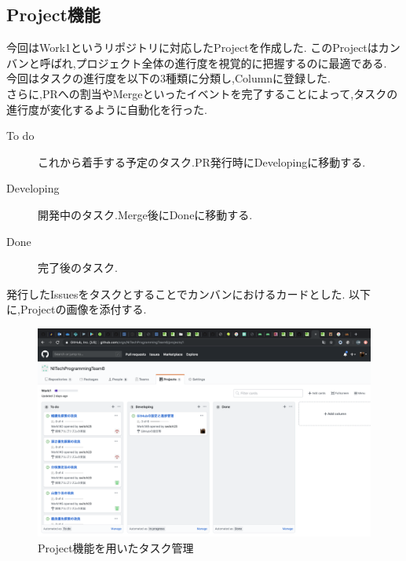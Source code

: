 \documentclass[uplatex,12pt]{jsarticle}
\begin{document}
\subsection{Project機能}
今回はWork1というリポジトリに対応したProjectを作成した.
このProjectはカンバンと呼ばれ,プロジェクト全体の進行度を視覚的に把握するのに最適である. \\
今回はタスクの進行度を以下の3種類に分類し,Columnに登録した. \\
さらに,PRへの割当やMergeといったイベントを完了することによって,タスクの進行度が変化するように自動化を行った.
\begin{description}
  \item[To do] これから着手する予定のタスク.PR発行時にDevelopingに移動する.
  \item[Developing] 開発中のタスク.Merge後にDoneに移動する.
  \item[Done] 完了後のタスク.
\end{description}
発行したIssuesをタスクとすることでカンバンにおけるカードとした.
以下に,Projectの画像を添付する.

\begin{figure}[!hbt]
  \centering
  \includegraphics[scale=0.25]{git_image/project_image.png}
  \caption{Project機能を用いたタスク管理}
\end{figure}

\newpage
\end{document}
